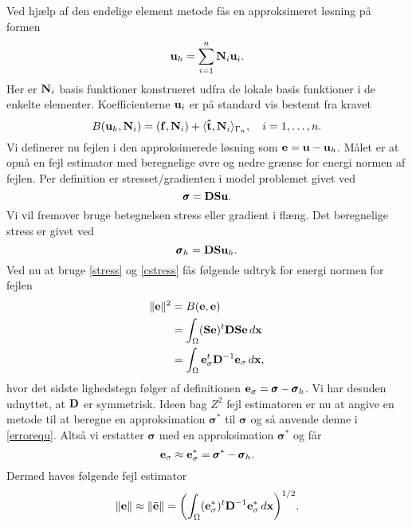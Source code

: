 Ved hjælp af den endelige element metode fås en approksimeret løsning
på formen
\begin{equation}
  {\bf u}_h = \sum_{i=1}^n {\bf N}_i {\bf u}_i .
\end{equation}
Her er ${\bf N}_i$ basis funktioner konstrueret udfra de lokale basis
funktioner i de enkelte elementer. Koefficienterne ${\bf u}_i$ er på
standard vis bestemt fra kravet
\begin{equation}
  B({\bf u}_h,{\bf N}_i) = ({\bf f},{\bf N}_i) +
  \langle {\bf\hat{t}},{\bf N}_i\rangle_{\Gamma_n}, \quad
  i=1,\ldots,n.
\end{equation}
Vi definerer nu fejlen i den approksimerede løsning som ${\bf e} =
{\bf u} - {\bf u}_h$. Målet er at opnå en fejl estimator med beregnelige
øvre og nedre grænse for energi normen af fejlen. Per definition er
stresset/gradienten i model problemet givet ved
\begin{equation} \label{stress}
  \pmb{\sigma} = {\bf DSu}.
\end{equation}
Vi vil fremover bruge betegnelsen stress eller gradient i flæng. Det
beregnelige stress er givet ved
\begin{equation} \label{cstress}
  \pmb{\sigma}_h = {\bf DSu}_h .
\end{equation}
Ved nu at bruge \eqref{stress} og \eqref{cstress} fås følgende udtryk
for energi normen for fejlen
\begin{align} \label{errorequ}
  \| {\bf e} \|^2 &= B({\bf e,e}) \\
  &= \int_{\Omega} ({\bf Se})^t {\bf DSe}\, d{\bf x} \notag \\
  &= \int_{\Omega} {\bf e}^t_\sigma {\bf D}^{-1}
     {\bf e}_\sigma\, d{\bf x}, \notag
\end{align}
hvor det sidste lighedstegn følger af definitionen ${\bf e}_\sigma =
\pmb{\sigma} - \pmb{\sigma}_h$. Vi har desuden udnyttet, at $\bf D$ er
symmetrisk. Ideen bag $Z^2$ fejl estimatoren er nu at angive en
metode til at beregne en approksimation $\pmb{\sigma}^{\ast}$ til
$\pmb{\sigma}$ og så anvende denne i \eqref{errorequ}. Altså vi
erstatter $\pmb{\sigma}$ med en approksimation $\pmb{\sigma}^{\ast}$ og får
\begin{equation}
  {\bf e_\sigma} \approx {\bf e_\sigma^{\ast}} =
  \pmb{\sigma}^{\ast} - \pmb{\sigma}_h .
\end{equation}
Dermed haves følgende fejl estimator
\begin{equation}
  \| {\bf e} \| \approx \|\tilde{\bf e}\| =
  \biggl( \int_{\Omega} ({\bf e}^{\ast}_\sigma)^t {\bf D}^{-1}
     {\bf e}_\sigma^{\ast}\, d{\bf x} \biggr)^{\scriptstyle 1/2}.
\end{equation}

